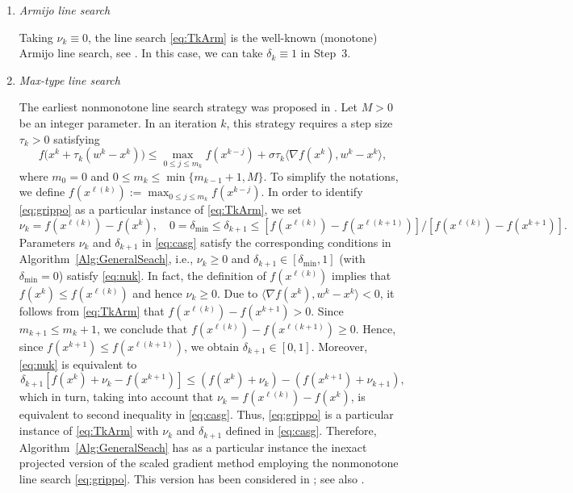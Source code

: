 \begin{enumerate}
	\item {\it Armijo line search}

	      Taking  $\nu_k\equiv 0$, the line search   \eqref{eq:TkArm}  is the well-known (monotone) Armijo line search, see \cite[Section 2.3]{Bertsekas1999}. In this case, we  can take  $\delta_k\equiv 1$ in Step~3.

	\item {\it Max-type line search}

	      The earliest nonmonotone line search strategy  was proposed  in \cite{Grippo1986}. Let $M>0$ be an integer parameter. In an iteration $k$, this strategy requires a step size $\tau_k>0$ satisfying
	      \begin{equation}\label{eq:grippo}
		      f\big(x^{k}+ \tau_k(w^k - x^{k})\big) \leq \max_{0\leq j\leq m_k}f(x^{k-j}) + \sigma \tau_k\big\langle \nabla f(x^{k}), w^k - x^{k} \big\rangle,
	      \end{equation}
	      where $m_0=0$ and $0\leq m_k\leq \min\{m_{k-1}+1, M\}$.  To simplify the notations,  we define $f(x^{\ell(k)}):=\max_{0\leq j\leq m_k}f(x^{k-j})$.  In order to identify \eqref{eq:grippo} as a particular instance of \eqref{eq:TkArm}, we  set
	      \begin{equation} \label{eq:casg}
		      \nu_{k}= f(x^{\ell(k)})-f(x^k), \quad 0=\delta_{\min}\leq \delta_{k+1}\leq  [f(x^{\ell(k)})- f(x^{\ell(k+1)})]/[f(x^{\ell(k)})-f(x^{k+1})].
	      \end{equation}
	      Parameters $\nu_{k}$ and $\delta_{k+1}$ in \eqref{eq:casg} satisfy the corresponding conditions in Algorithm~\ref{Alg:GeneralSeach}, i.e.,  $\nu_{k} \geq 0$ and  $\delta_{k+1}\in [\delta_{\min}, 1]$ (with   $\delta_{\min}=0$)  satisfy \eqref{eq:nuk}.  In fact, the definition of $f(x^{\ell(k)})$ implies that   $ f(x^{k})\leq f(x^{\ell(k)})$ and hence $\nu_{k} \geq 0$.  Due to  $\langle \nabla f(x^{k}), w^k - x^{k} \rangle<0$,   it follows from  \eqref{eq:TkArm} that $f(x^{\ell(k)})-f(x^{k+1})>0$. Since   $m_{k+1}\leq m_{k}+1$, we conclude that  $f(x^{\ell(k)})-f(x^{\ell(k+1)}) \geq 0$.  Hence, since $ f(x^{k+1})\leq f(x^{\ell(k+1)})$, we obtain $\delta_{k+1}\in [0, 1]$.  Moreover,  \eqref{eq:nuk} is equivalent  to
	      $$
		      \delta_{k+1}[f(x^{k})+\nu_{k}-f(x^{k+1})] \leq(f(x^{k})+\nu_{k}) -  (f(x^{k+1})+ \nu_{k+1}),
	      $$
	      which in turn, taking into account  that $\nu_{k}= f(x^{\ell(k)})-f(x^k)$, is equivalent to second inequality in \eqref{eq:casg}. Thus, \eqref{eq:grippo} is a particular instance of \eqref{eq:TkArm} with  $\nu_{k}$ and $\delta_{k+1}$ defined in \eqref{eq:casg}.  Therefore,  Algorithm~\ref{Alg:GeneralSeach} has as a particular instance the  inexact   projected  version of the scaled gradient method employing   the nonmonotone line search  \eqref{eq:grippo}. This version has been considered in \cite{BirginMartinezRaydan2003}; see also  \cite{Bonettini2009, WangLiu2005}.



\end{enumerate}
